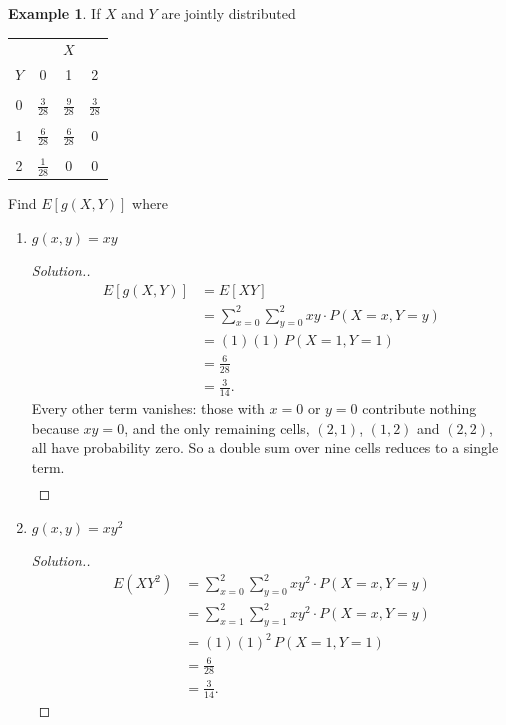 \documentclass[12pt,a4paper]{report}
\theoremstyle{definition}
\newtheorem{example}[thm]{Example}
\theoremstyle{plain}
\theoremstyle{definition}
\begin{document}
\begin{example}
If $X$ and $Y$ are jointly distributed 

\begin{table}[H]
\centering

\begin{tabular}{c|ccc}
&\multicolumn{3}{c}{$X$}\\
$Y$ & 0 & 1 & 2\\
\hline
&&&\\
0 & $\frac{3}{28}$ & $\frac{9}{28}$ & $\frac{3}{28}$\\
&&&\\
1 & $\frac{6}{28}$ & $\frac{6}{28}$ & 0\\
&&&\\
2 & $\frac{1}{28}$ & 0 & 0\\
\end{tabular}
\end{table} 

Find $E[g(X,Y)]$ where

\begin{enumerate}
\item $g(x,y)=xy$
\begin{proof}[\textit{Solution.}]
\begin{align*}
E[g(X,Y)] & = E[XY]\\
 & = \sum^2_{x=0}\sum^2_{y=0}xy\cdot P(X=x,Y=y)\\
               & = (1)(1)\, P(X=1,Y=1)\\
               & = \frac{6}{28}\\
               & = \frac{3}{14}.
\end{align*}
Every other term vanishes: those with $x=0$ or $y=0$ contribute nothing because
$xy=0$, and the only remaining cells, $(2,1)$, $(1,2)$ and $(2,2)$, all have
probability zero. So a double sum over nine cells reduces to a single term.
\begin{align*}
\end{align*}   
\end{proof}



\item $g(x,y)=xy^2$
\begin{proof}[\textit{Solution}.]
\begin{align*}
E(XY^2) & =\sum^2_{x=0}\sum^2_{y=0}xy^2\cdot P(X=x,Y=y)\\
        & =\sum^2_{x=1}\sum^2_{y=1}xy^2\cdot P(X=x,Y=y)\\
        & = (1)(1)^2\, P(X=1,Y=1)\\
        & = \frac{6}{28}\\
        & = \frac{3}{14}.
\end{align*}
\end{proof}


\end{enumerate}
\end{example}
\end{document}
